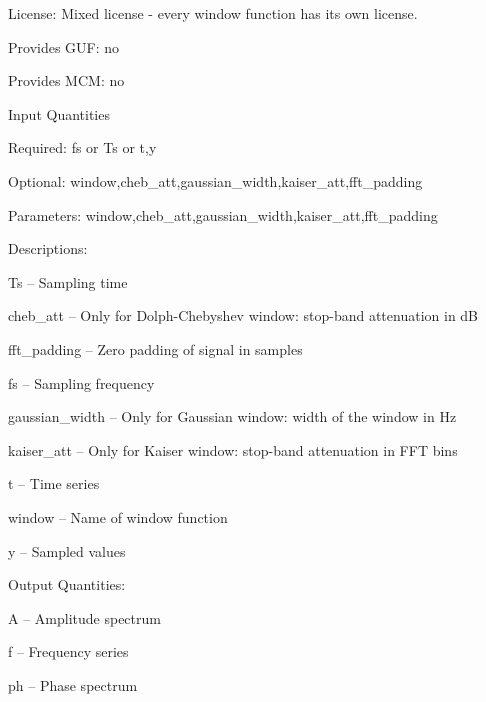 \begin{tightdesc}
\item [License:] Mixed license - every window function has its own license.
\item [Provides GUF:] no
\item [Provides MCM:] no
\item [Input Quantities] \rule{0em}{0em}
    \begin{tightdesc}
    \item [Required:] 
        \textsf{fs} or \textsf{Ts} or \textsf{t},\enspace \textsf{y}
    \item [Optional:] 
        \textsf{window},\enspace \textsf{cheb\_att},\enspace \textsf{gaussian\_width},\enspace \textsf{kaiser\_att},\enspace \textsf{fft\_padding}
    \item [Parameters:] 
        \textsf{window},\enspace \textsf{cheb\_att},\enspace \textsf{gaussian\_width},\enspace \textsf{kaiser\_att},\enspace \textsf{fft\_padding}
    \item [Descriptions:] \rule{0em}{0em}
        \begin{tightdesc}
            \item[\textsf{Ts}] -- Sampling time
            \item[\textsf{cheb\_att}] -- Only for Dolph-Chebyshev window: stop-band attenuation in dB
            \item[\textsf{fft\_padding}] -- Zero padding of signal in samples
            \item[\textsf{fs}] -- Sampling frequency
            \item[\textsf{gaussian\_width}] -- Only for Gaussian window: width of the window in Hz
            \item[\textsf{kaiser\_att}] -- Only for Kaiser window: stop-band attenuation in FFT bins
            \item[\textsf{t}] -- Time series
            \item[\textsf{window}] -- Name of window function
            \item[\textsf{y}] -- Sampled values
        \end{tightdesc}
    \end{tightdesc}
\item [Output Quantities:] \rule{0em}{0em}
    \begin{tightdesc}
        \item[\textsf{A}] -- Amplitude spectrum
        \item[\textsf{f}] -- Frequency series
        \item[\textsf{ph}] -- Phase spectrum
    \end{tightdesc}
\end{tightdesc}
